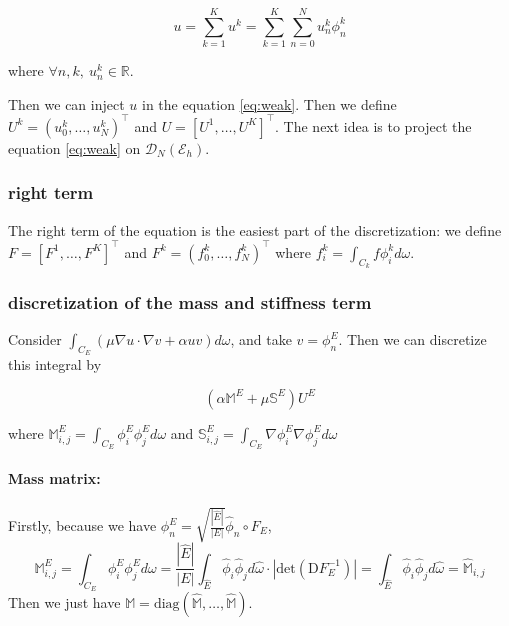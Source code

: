 \documentclass[a4paper,10pt,draft]{article}
\begin{document}
$$
u = \sum_{k=1}^K u^k = \sum_{k=1}^K \sum_{n=0}^N u_n^k \phi_n^k
$$

where $\forall n,k,\ u_n^k \in \mathbb{R}$.


Then we can inject $u$ in the equation \ref{eq:weak}. Then we define $U^k = 
(u_0^k, \dots , u_N^k)^\top$ and $U = [U^1, \dots , U^K]^\top$. The next idea is to project the 
equation \ref{eq:weak} on $\mathcal{D}_N(\mathcal{E}_h)$.

\subsubsection{right term}

The right term of the equation is the easiest part of the discretization: we define $F = [F^1, 
\dots , F^K]^\top$ and $F^k = 
(f_0^k, \dots , f_N^k)^\top$ where $f_i^k = \int_{C_k} f \phi_i^k d\omega$.



\subsubsection{discretization of the mass and stiffness term}

Consider $\int_{C_E} (\mu \nabla u  \cdot \nabla v + \alpha uv) d\omega$, and take $v = \phi_n^E$. 
Then 
we can discretize this integral by

\begin{equation}
 \left( \alpha \mathbb{M}^E + \mu \mathbb{S}^E  \right) U^E
\end{equation}

where $\mathbb{M}^E_{i,j} = \int_{C_E} \phi_i^E \phi_j^E d\omega$ and $\mathbb{S}_{i,j}^E =
\int_{C_E} \nabla \phi_i^E \nabla \phi_j^E d\omega$

\paragraph{Mass matrix:}
Firstly, because we have $\phi_n^E = \sqrt{\frac{|\hat E|}{|E|}} \hat \phi_n \circ F_E$,
\begin{equation*}
 \mathbb{M}^E_{i,j} = \int_{C_E} \phi_i^E \phi_j^E d\omega 
 = \frac{|\hat E|}{|E|} \int_{\hat E} \hat \phi_i \hat \phi_j d\hat \omega \cdot |\mathrm{det} 
(\mathrm{D} F_E^{-1})| 
= \int_{\hat E} \hat \phi_i \hat \phi_j d\hat \omega 
=\widehat{\mathbb{M}}_{i,j}
\end{equation*}
Then we just have $\mathbb{M} = \mathrm{diag} ( \widehat{\mathbb{M}}, \dots, \widehat{\mathbb{M}})$.
\end{document}
